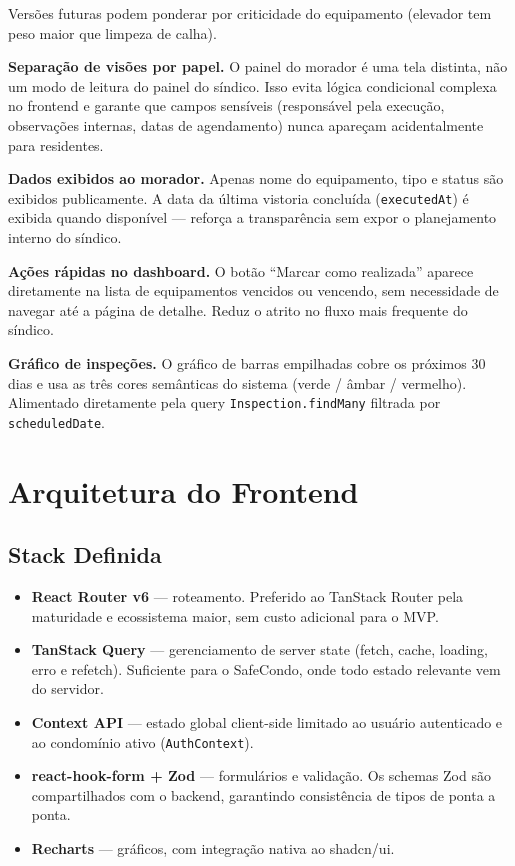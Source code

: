 \documentclass[12pt, a4paper]{article}
\begin{document}
Versões futuras podem ponderar por criticidade do equipamento (elevador
tem peso maior que limpeza de calha).

\textbf{Separação de visões por papel.}
O painel do morador é uma tela distinta, não um modo de leitura do painel do
síndico. Isso evita lógica condicional complexa no frontend e garante que campos
sensíveis (responsável pela execução, observações internas, datas de agendamento)
nunca apareçam acidentalmente para residentes.

\textbf{Dados exibidos ao morador.}
Apenas nome do equipamento, tipo e status são exibidos publicamente. A data da
última vistoria concluída (\texttt{executedAt}) é exibida quando disponível —
reforça a transparência sem expor o planejamento interno do síndico.

\textbf{Ações rápidas no dashboard.}
O botão ``Marcar como realizada'' aparece diretamente na lista de equipamentos
vencidos ou vencendo, sem necessidade de navegar até a página de detalhe.
Reduz o atrito no fluxo mais frequente do síndico.

\textbf{Gráfico de inspeções.}
O gráfico de barras empilhadas cobre os próximos 30 dias e usa as três cores
semânticas do sistema (verde / âmbar / vermelho). Alimentado diretamente pela
query \texttt{Inspection.findMany} filtrada por \texttt{scheduledDate}.


\vspace{0.5cm}

\section{Arquitetura do Frontend}
\label{sec:frontarq}

\subsection{Stack Definida}

\begin{itemize}[leftmargin=1.5em]
    \item \textbf{React Router v6} --- roteamento. Preferido ao TanStack Router
    pela maturidade e ecossistema maior, sem custo adicional para o MVP.
    \item \textbf{TanStack Query} --- gerenciamento de server state (fetch, cache,
    loading, erro e refetch). Suficiente para o SafeCondo, onde todo estado relevante
    vem do servidor.
    \item \textbf{Context API} --- estado global client-side limitado ao usuário
    autenticado e ao condomínio ativo (\texttt{AuthContext}).
    \item \textbf{react-hook-form + Zod} --- formulários e validação. Os schemas Zod
    são compartilhados com o backend, garantindo consistência de tipos de ponta a ponta.
    \item \textbf{Recharts} --- gráficos, com integração nativa ao shadcn/ui.
\end{itemize}
\end{document}
